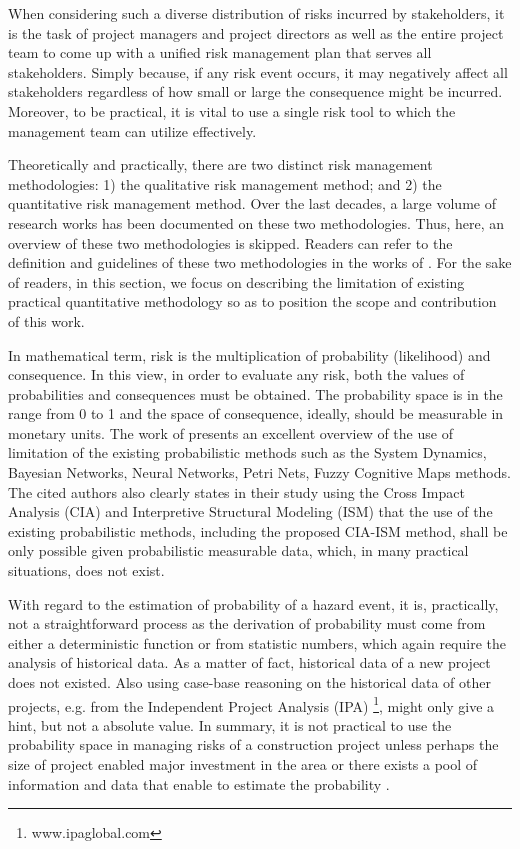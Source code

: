 \documentclass[10pt,halfline,a4paper]{ouparticle}
\begin{document}
When considering such a diverse distribution of risks incurred by stakeholders, it is the task of project managers and project directors as well as the entire project team to come up with a unified risk management plan that serves all stakeholders. Simply because, if any risk event occurs, it may negatively affect all stakeholders regardless of how small or large the consequence might be incurred. Moreover, to be practical, it is vital to use a single risk tool to which the management team can utilize effectively.


Theoretically and practically, there are two distinct risk management methodologies: 1) the qualitative risk management method; and 2) the quantitative risk management method. Over the last decades, a large volume of research works has been documented on these two methodologies. Thus, here, an overview of these two methodologies is skipped. Readers can refer to the definition and guidelines of these two methodologies in the works of \citep{Schatteman2008,Al-Bahar1990,Cano2002, PMI2009,Zou2010, McNeil2011,Kendrick2015,Bissonette2016, PMI2017,Banuls2017}. For the sake of readers, in this section, we focus on describing the limitation of existing practical quantitative methodology so as to position the scope and contribution of this work. 

In mathematical term, risk is the multiplication of probability (likelihood) and consequence. In this view, in order to evaluate any risk, both the values of probabilities and consequences must be obtained. The probability space is in the range from 0 to 1 and the space of consequence, ideally, should be measurable in monetary units. The work of \citet{Banuls2017} presents an excellent overview of the use of limitation of the existing probabilistic methods such as the System Dynamics, Bayesian Networks, Neural Networks, Petri Nets, Fuzzy Cognitive Maps methods. The cited authors also clearly states in their study using the Cross Impact Analysis (CIA) and Interpretive Structural Modeling (ISM) that the use of the existing probabilistic methods, including the proposed CIA-ISM method, shall be only possible given probabilistic measurable data, which, in many practical situations, does not exist. 


With regard to the estimation of probability of a hazard event, it is, practically, not a straightforward process as the derivation of probability must come from either a deterministic function or from statistic numbers, which again require the analysis of historical data. As a matter of fact, historical data of a new project does not existed. Also using case-base reasoning on the historical data of other projects, e.g. from the Independent Project Analysis (IPA) \footnote{www.ipaglobal.com}, might only give a hint, but not a absolute value. In summary, it is not practical to use the probability space in managing risks of a construction project unless perhaps the size of project enabled major investment in the area or there exists a pool of information and data that enable to estimate the probability \citep{Banuls2017}.
\end{document}
